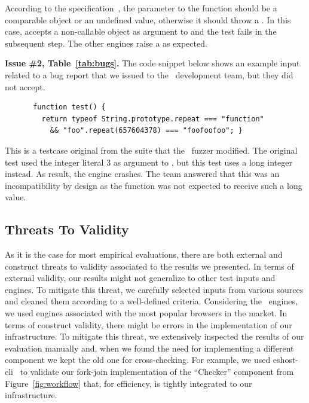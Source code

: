 \documentclass[sigconf,review, anonymous]{acmart}
\begin{document}
According to the specification~\cite{ecmas262-array-sort}, the
parameter to the  function should be a comparable
object or an undefined value, otherwise it should throw a
. In this case, \jsc{} accepts a non-callable object
as argument to  and the test fails in the subsequent
step. The other engines raise a  as expected.

\vspace{1ex}\noindent\textbf{Issue \#2, Table~\ref{tab:bugs}.}  The
code snippet below shows an example input related to a bug report that
we issued to the \chakra\ development team, but they did not accept.

\begin{figure}[h!]
  \centering
  \scriptsize
  \begin{lstlisting}
 function test() {
   return typeof String.prototype.repeat === "function"
     && "foo".repeat(657604378) === "foofoofoo"; }
  \end{lstlisting}
  \normalsize
\end{figure}


This is a testcase original from the \jsc{} suite that the
\radamsa\ fuzzer modified. The original test used the integer literal
3 as argument to , but this test uses a long integer
instead. As result, the engine crashes. The team answered that this
was an incompatibility by design as the function was not expected to
receive such a long value.


\subsection{Threats To Validity}

As it is the case for most empirical evaluations, there are both
external and construct threats to validity associated to the results
we presented. In terms of external validity, our results might not
generalize to other test inputs and engines. To mitigate this threat,
we carefully selected inputs from various sources and cleaned them
according to a well-defined criteria. Considering the \js\ engines, we
used engines associated with the most popular browsers in the
market. In terms of construct validity, there might be errors in the
implementation of our infrastructure. To mitigate this threat, we
extensively inspected the results of our evaluation manually and, when
we found the need for implementing a different component we kept the
old one for cross-checking. For example, we used
eshost-cli~\cite{eshost-cli} to validate our fork-join implementation
of the ``Checker'' component from Figure~\ref{fig:workflow} that, for
efficiency, is tightly integrated to our infrastructure.
\end{document}
